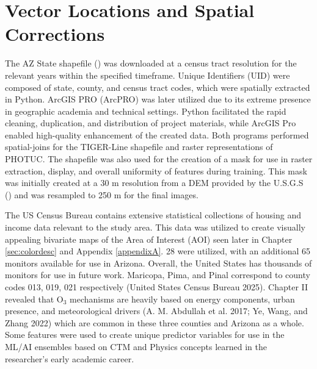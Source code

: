 \section{Vector Locations and Spatial Corrections} \label{methods:vlsc} The AZ State shapefile (\cite{united_states_census_bureau_tigerline_2022}) was downloaded at a census tract resolution for the relevant years within the specified timeframe. Unique Identifiers (UID) were composed of state, county, and census tract codes, which were spatially extracted in Python. ArcGIS PRO (ArcPRO) was later utilized due to its extreme presence in geographic academia and technical settings. Python facilitated the rapid cleaning, duplication, and distribution of project materials, while ArcGIS Pro enabled high-quality enhancement of the created data. Both programs performed spatial-joins for the TIGER-Line shapefile and raster representations of PHOTUC. The shapefile was also used for the creation of a mask for use in raster extraction, display, and overall uniformity of features during training. This mask was initially created at a 30 m resolution from a DEM provided by the U.S.G.S (\cite{us_geological_survey_1_2024}) and was resampled to 250 m for the final images.

The US Census Bureau contains extensive statistical collections of housing and income data relevant to the study area. This data was utilized to create visually appealing bivariate maps of the Area of Interest (AOI) seen later in Chapter \ref{sec:colordesc} and Appendix \ref{appendixA}. 28 were utilized, with an additional 65 monitors available for use in Arizona. Overall, the United States has thousands of monitors for use in future work. Maricopa, Pima, and Pinal correspond to county codes 013, 019, 021 respectively (United States Census Bureau 2025). Chapter II revealed that O$_3$ mechanisms are heavily based on energy components, urban presence, and meteorological drivers (A. M. Abdullah et al. 2017; Ye, Wang, and Zhang 2022) which are common in these three counties and Arizona as a whole. Some features were used to create unique predictor variables for use in the ML/AI ensembles based on CTM and Physics concepts learned in the researcher’s early academic career. 
